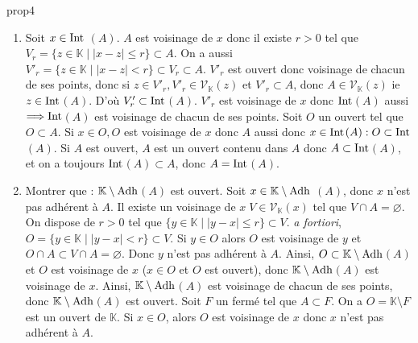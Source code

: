 \documentclass[12pt,a4paper]{report}
\begin{document}
\begin{demonstration}{prop4}
\begin{enumerate}
\item Soit $x \in \rm{Int}$ $(A)$. $A$ est voisinage de $x$ donc il existe $r>0$ tel que $V_r = \{z \in \mathbb{K} \mid \lvert x-z \rvert \leq r \} \subset A$.
\newline On a aussi $V'_r = \{z \in \mathbb{K} \mid \lvert x-z \rvert < r \} \subset V_r \subset A$.
\newline $V'_r$ est ouvert donc voisinage de chacun de ses points, donc si $z \in V'_r, V'_r \in \mathcal{V}_\mathbb{K}(z)$ et $V'_r \subset A$, donc $A \in \mathcal{V}_\mathbb{K}(z)$ ie $z \in \rm{Int}$$(A)$.
\newline D'où $V'_r \subset \rm{Int}$$(A)$. $V'_r$ est voisinage de $x$ donc $\rm{Int}$$(A)$ aussi $\Longrightarrow \rm{Int}$$(A)$ est voisinage de chacun de ses points.
\newline \newline Soit $O$ un ouvert tel que $O \subset A$. Si $x \in O, O$ est voisinage de $x$ donc $A$ aussi donc $x \in \rm{Int}$$(A) : O \subset \rm{Int}$$(A)$.
\newline \newline Si $A$ est ouvert, $A$ est un ouvert contenu dans $A$ donc $A \subset \rm{Int}$$(A)$, et on a toujours $\rm{Int}$$(A) \subset A$, donc $A=\rm{Int}$$(A)$.
%
\item Montrer que  : $\mathbb{K} \setminus \rm{Adh}$$(A)$ est ouvert. Soit $x \in \mathbb{K} \setminus \rm{Adh}$ $(A)$, donc $x$ n'est pas adhérent à $A$.
\newline Il existe un voisinage de $x \; V \in \mathcal{V}_\mathbb{K}(x)$ tel que $V \cap A = \varnothing$.
\newline On dispose de $r > 0$ tel que $\{y \in \mathbb{K} \mid \lvert y-x \rvert \leq r \} \subset V$.
\newline \emph{a fortiori}, $O = \{ y \in \mathbb{K} \mid \lvert y-x \rvert < r \} \subset V$. Si $y \in O$ alors $O$ est voisinage de $y$ et $O \cap A \subset V \cap A = \varnothing$.
\newline Donc $y$ n'est pas adhérent à $A$. Ainsi, $O \subset \mathbb{K} \setminus \rm{Adh}$$(A)$ et $O$ est voisinage de $x$ ($x \in O$ et $O$ est ouvert), donc $\mathbb{K} \setminus \rm{Adh}$$(A)$ est voisinage de $x$.
\newline Ainsi, $\mathbb{K} \setminus \rm{Adh}$$(A)$ est voisinage de chacun de ses points, donc $\mathbb{K} \setminus \rm{Adh}$$(A)$ est ouvert.
\newline \newline Soit $F$ un fermé tel que $A \subset F$. On a $O = \mathbb{K} \setminus F$ est un ouvert de $\mathbb{K}$. Si $x \in O$, alors $O$ est voisinage de $x$ donc $x$ n'est pas adhérent à $A$.

\end{enumerate}
\end{demonstration}
\end{document}
